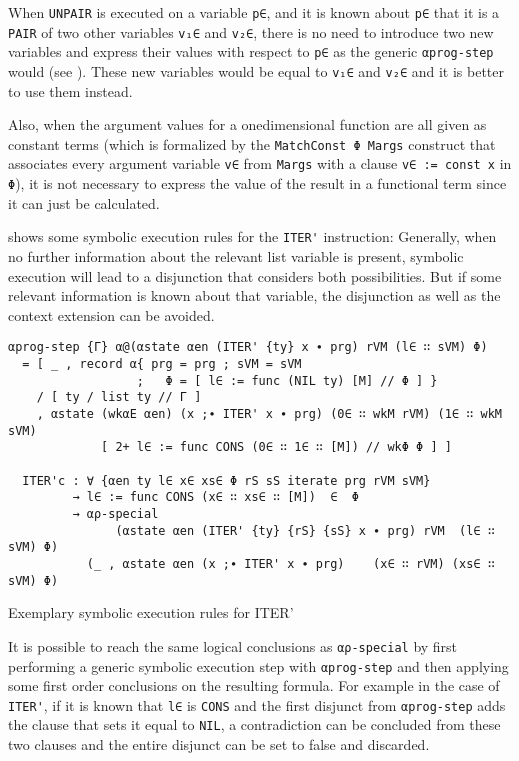When \verb/UNPAIR/ is executed on a variable \verb/p∈/,
and it is known about \verb/p∈/ that it is a \verb/PAIR/
of two other variables \verb/v₁∈/ and \verb/v₂∈/,
there is no need to introduce two new variables and express their values with respect to \verb/p∈/
as the generic \verb/αprog-step/ would (see ).
These new variables would be equal to \verb/v₁∈/ and \verb/v₂∈/
and it is better to use them instead.

Also, when the argument values for a onedimensional function are all given as constant terms
(which is formalized by the \verb/MatchConst Φ Margs/ construct that associates every argument
variable \verb/v∈/ from \verb/Margs/ with a clause \verb/v∈ := const x/ in \verb/Φ/),
it is not necessary to express the value of the result in a functional term
since it can just be calculated.

 shows some symbolic execution rules for the \verb/ITER'/ instruction:
Generally, when no further information about the relevant list variable is present,
symbolic execution will lead to a disjunction that considers both possibilities.
But if some relevant information is known about that variable,
the disjunction as well as the context extension can be avoided.

\begin{listing}[!ht]
\begin{verbatim}
αprog-step {Γ} α@(αstate αen (ITER' {ty} x ∙ prg) rVM (l∈ ∷ sVM) Φ)
  = [ _ , record α{ prg = prg ; sVM = sVM 
                  ;   Φ = [ l∈ := func (NIL ty) [M] // Φ ] }
    / [ ty / list ty // Γ ]
    , αstate (wkαE αen) (x ;∙ ITER' x ∙ prg) (0∈ ∷ wkM rVM) (1∈ ∷ wkM sVM)
             [ 2+ l∈ := func CONS (0∈ ∷ 1∈ ∷ [M]) // wkΦ Φ ] ]

  ITER'c : ∀ {αen ty l∈ x∈ xs∈ Φ rS sS iterate prg rVM sVM}
         → l∈ := func CONS (x∈ ∷ xs∈ ∷ [M])  ∈  Φ
         → αρ-special
               (αstate αen (ITER' {ty} {rS} {sS} x ∙ prg) rVM  (l∈ ∷ sVM) Φ)
           (_ , αstate αen (x ;∙ ITER' x ∙ prg)    (x∈ ∷ rVM) (xs∈ ∷ sVM) Φ)
\end{verbatim}
\caption{Exemplary symbolic execution rules for ITER'}
\label{a-ITER'}
\end{listing}

It is possible to reach the same logical conclusions as \verb/αρ-special/
by first performing a generic symbolic execution step with \verb/αprog-step/
and then applying some first order conclusions on the resulting formula.
For example in the case of \verb/ITER'/,
if it is known that \verb/l∈/ is \verb/CONS/
and the first disjunct from \verb/αprog-step/ adds the clause that sets it equal to \verb/NIL/,
a contradiction can be concluded from these two clauses and the entire disjunct
can be set to false and discarded.

